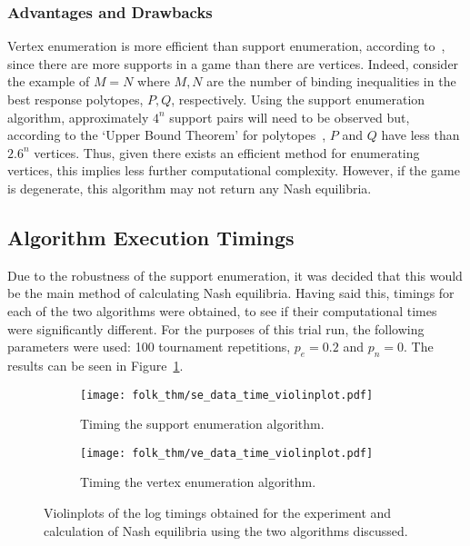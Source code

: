 \subsubsection{Advantages and Drawbacks}\label{subsubsec:Adv_and_Drawbacks}
Vertex enumeration is more efficient than support enumeration, according
to~\cite{NoamNisan2007}, since there are more supports in a game than there are
vertices. Indeed, consider the example of \(M = N\) where \(M, N\) are the
number of binding inequalities in the best response polytopes, \(P, Q\),
respectively. Using the support enumeration algorithm, approximately \(4^{n}\)
support pairs will need to be observed but, according to the `Upper Bound
Theorem' for polytopes~\cite{Alon1985,Brondsted2012,Seidel1995}, \(P\) and \(Q\) have less than \(2.6^{n}\) vertices.
Thus, given there exists an efficient method for enumerating vertices, this
implies less further computational complexity. However, if the game is
degenerate, this algorithm may not return any Nash equilibria. 

\subsection{Algorithm Execution Timings}\label{subsec:Alg_Execution_Times}
Due to the robustness of the support enumeration, it was decided that this would
be the main method of calculating Nash equilibria. Having said this, timings for
each of the two algorithms were obtained, to see
if their computational times were significantly different. For
the purposes of this trial run, the following parameters were used: 100
tournament repetitions, \(p_{e} = 0.2\) and \(p_{n} = 0\). The results can be
seen in Figure~\ref{fig:timing_exp}.

\begin{figure}
    \centering
    \begin{subfigure}{0.45\textwidth}
        \centering
        \texttt{[image: folk\_thm/se\_data\_time\_violinplot.pdf]}
        \caption{Timing the support enumeration algorithm.}
    \end{subfigure}
    \hspace{3pt}
    \begin{subfigure}{0.45\textwidth}
        \centering
        \texttt{[image: folk\_thm/ve\_data\_time\_violinplot.pdf]}
        \caption{Timing the vertex enumeration algorithm.}
    \end{subfigure}
    \caption{Violinplots of the log timings obtained for the experiment and calculation of Nash equilibria using the two algorithms discussed.}\label{fig:timing_exp}
\end{figure}

